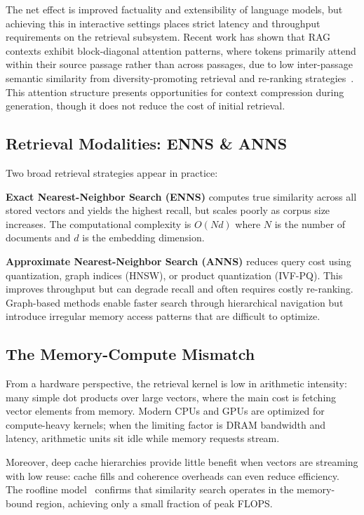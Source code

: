 \documentclass[conference]{IEEEtran}
\begin{document}
The net effect is improved factuality and extensibility of language models, but achieving this in interactive settings places strict latency and throughput requirements on the retrieval subsystem. Recent work has shown that RAG contexts exhibit block-diagonal attention patterns, where tokens primarily attend within their source passage rather than across passages, due to low inter-passage semantic similarity from diversity-promoting retrieval and re-ranking strategies~\cite{refrag2025}. This attention structure presents opportunities for context compression during generation, though it does not reduce the cost of initial retrieval.

\subsection{Retrieval Modalities: ENNS \& ANNS}

Two broad retrieval strategies appear in practice:

\textbf{Exact Nearest-Neighbor Search (ENNS)} computes true similarity across all stored vectors and yields the highest recall, but scales poorly as corpus size increases. The computational complexity is $O(Nd)$ where $N$ is the number of documents and $d$ is the embedding dimension.

\textbf{Approximate Nearest-Neighbor Search (ANNS)} reduces query cost using quantization, graph indices (HNSW), or product quantization (IVF-PQ). This improves throughput but can degrade recall and often requires costly re-ranking. Graph-based methods enable faster search through hierarchical navigation but introduce irregular memory access patterns that are difficult to optimize.

\subsection{The Memory-Compute Mismatch}

From a hardware perspective, the retrieval kernel is low in arithmetic intensity: many simple dot products over large vectors, where the main cost is fetching vector elements from memory. Modern CPUs and GPUs are optimized for compute-heavy kernels; when the limiting factor is DRAM bandwidth and latency, arithmetic units sit idle while memory requests stream.

Moreover, deep cache hierarchies provide little benefit when vectors are streaming with low reuse: cache fills and coherence overheads can even reduce efficiency. The roofline model~\cite{williams2009roofline} confirms that similarity search operates in the memory-bound region, achieving only a small fraction of peak FLOPS.
\end{document}
